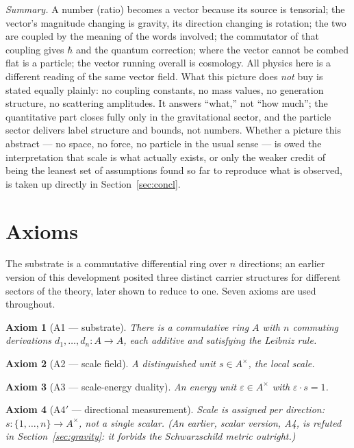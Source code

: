 \documentclass[pdflatex,sn-mathphys-num]{sn-jnl}
\theoremstyle{thmstyleone}
\newtheorem{axiom}{Axiom}
\theoremstyle{thmstylethree}
\theoremstyle{thmstyletwo}
\begin{document}
\emph{Summary.} A number (ratio) becomes a vector because its source is
tensorial; the vector's magnitude changing is gravity, its direction
changing is rotation; the two are coupled by the meaning of the words
involved; the commutator of that coupling gives $\hbar$ and the quantum
correction; where the vector cannot be combed flat is a particle; the
vector running overall is cosmology. All physics here is a different
reading of the same vector field. What this picture does \emph{not} buy
is stated equally plainly: no coupling constants, no mass values, no
generation structure, no scattering amplitudes. It answers ``what,'' not
``how much''; the quantitative part closes fully only in the
gravitational sector, and the particle sector delivers label structure
and bounds, not numbers. Whether a picture this abstract — no space, no
force, no particle in the usual sense — is owed the interpretation that
scale is what actually exists, or only the weaker credit of being the
leanest set of assumptions found so far to reproduce what is observed, is
taken up directly in Section~\ref{sec:concl}.

\section{Axioms}\label{sec:axioms}

The substrate is a commutative differential ring over $n$ directions; an
earlier version of this development posited three distinct carrier
structures for different sectors of the theory, later shown to reduce to
one. Seven axioms are used throughout.

\begin{axiom}[A1 — substrate]
There is a commutative ring $A$ with $n$ commuting derivations
$d_1,\dots,d_n : A \to A$, each additive and satisfying the Leibniz rule.
\end{axiom}

\begin{axiom}[A2 — scale field]
A distinguished unit $s \in A^\times$, the local scale.
\end{axiom}

\begin{axiom}[A3 — scale-energy duality]
An energy unit $\varepsilon\in A^\times$ with $\varepsilon\cdot s = 1$.
\end{axiom}

\begin{axiom}[A4$'$ — directional measurement]
Scale is assigned per direction: $s : \{1,\dots,n\}\to A^\times$, not a
single scalar. (An earlier, scalar version, A4, is refuted in
Section~\ref{sec:gravity}: it forbids the Schwarzschild metric outright.)
\end{axiom}
\end{document}
